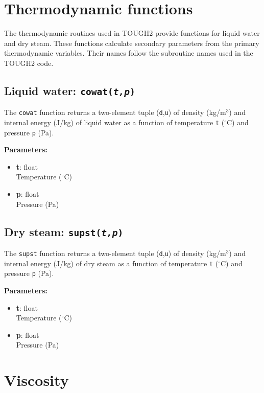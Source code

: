 \section{Thermodynamic functions}

The thermodynamic routines used in TOUGH2 provide functions for liquid water and dry steam.  These functions calculate secondary parameters from the primary thermodynamic variables.  Their names follow the subroutine names used in the TOUGH2 code.

\subsection{Liquid water: \texttt{cowat(\emph{t,p})}}

The \texttt{cowat} function returns a two-element tuple (\texttt{d},\texttt{u}) of density (kg/m$^3$) and internal energy (J/kg) of liquid water as a function of temperature \texttt{t} ($^{\circ}$C) and pressure \texttt{p} (Pa).

\textbf{Parameters:}
\begin{itemize}
\item \textbf{t}: float\\
  Temperature ($^{\circ}$C)
\item \textbf{p}: float\\
  Pressure (Pa)
\end{itemize}

\subsection{Dry steam: \texttt{supst(\emph{t,p})}}

The \texttt{supst} function returns a two-element tuple (\texttt{d},\texttt{u}) of density (kg/m$^3$) and internal energy (J/kg) of dry steam as a function of temperature \texttt{t} ($^{\circ}$C) and pressure \texttt{p} (Pa).

\textbf{Parameters:}
\begin{itemize}
\item \textbf{t}: float\\
  Temperature ($^{\circ}$C)
\item \textbf{p}: float\\
  Pressure (Pa)
\end{itemize}

\section{Viscosity}

